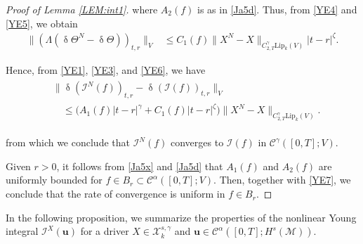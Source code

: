 \documentclass[letterpaper, 11pt,  reqno]{amsart}
\newcommand{\1}{\hspace{0.5mm}\text{I}\hspace{0.5mm}}
\newcommand{\I}{\mathcal{I}}
\newcommand{\noi}{\noindent}
\newcommand{\CC}{\mathcal{C}}
\newcommand{\al}{\alpha}
\newcommand{\updl}{\updelta}
\newcommand{\g}{\gamma}
\newcommand{\M}{\mathcal{M}}
\newcommand{\cX}{\mathcal{X}}
\newcommand{\Lip}{\mathrm{Lip}}
\newcommand{\uu}{\mathbf{u}}
\newcommand{\z}{\zeta}
\newcommand{\Ta}{\Theta}
\numberwithin{equation}{section}
\numberwithin{theorem}{section}
\begin{document}
\begin{proof}[Proof of Lemma \ref{LEM:int1}]
\noi
where $A_2(f)$ is as in 
\eqref{Ja5d}.
Thus, from \eqref{YE4} and \eqref{YE5}, we obtain
\begin{align}
\|(\Lambda (\updl \Theta^N - \updl \Ta))_{t,r}\|_{V}
& \le 
C_1(f)
 \|X^N - X\|_{C^\g_{2,T}\Lip_k(V)}
|t-r|^{\z}.
\label{YE6}
\end{align}


Hence, from \eqref{YE1}, \eqref{YE3}, and \eqref{YE6}, we have
\begin{align}
\begin{split}
& \|\updl (\I^N(f))_{t, r} - \updl (\I(f))_{t, r}\|_{V}  \\
& \quad \le 
\Big( A_1(f) |t - r|^\g
+  C_1(f)
|t-r|^{\z}\Big)
\|X^N - X\|_{C^\g_{2,T}\Lip_k(V)}.
\end{split}
\label{YE7}
\end{align}

\noi
from which 
we conclude 
that $\I^N(f)$ converges
to $\I(f)$ in $\CC^\g([0, T]; V)$.

Given $r > 0$, it follows from \eqref{Ja5x}
and 
\eqref{Ja5d}
that 
$A_1(f)$ and $A_2(f)$
are uniformly bounded
for $f \in B_r\subset \CC^{\al}([0,T];V)$.
Then, together with \eqref{YE7}, 
we conclude that  
the rate of convergence is
uniform in $f \in B_r$.  
\end{proof}






In the following proposition, 
we summarize
the properties
of the nonlinear Young integral
$\I^X(\uu)$
for a driver 
 $X\in \cX^{s, \g}_k$
 and $\uu \in  \CC^{\al}([0,T]; H^s(\M))$. 
\end{document}
